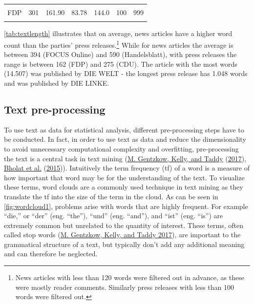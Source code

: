 \documentclass[
]{article}
\begin{document}
\begin{table}[H]
\begin{tabular}[t]{lrrrrrr}
\hspace{1em}\cellcolor{gray!6}{DIE LINKE} & \cellcolor{gray!6}{686} & \cellcolor{gray!6}{200.47} & \cellcolor{gray!6}{71.78} & \cellcolor{gray!6}{190.0} & \cellcolor{gray!6}{101} & \cellcolor{gray!6}{1048}\\
\hspace{1em}FDP & 301 & 161.90 & 83.78 & 144.0 & 100 & 999\\
\hspace{1em}\cellcolor{gray!6}{SPD} & \cellcolor{gray!6}{315} & \cellcolor{gray!6}{213.41} & \cellcolor{gray!6}{56.16} & \cellcolor{gray!6}{208.0} & \cellcolor{gray!6}{103} & \cellcolor{gray!6}{429}\\
\bottomrule
\end{tabular}
\end{table}

\autoref{tab:textlength} illustrates that on average, news articles have
a higher word count than the parties' press releases.\footnote{News
  articles with less than 120 words were filtered out in advance, as
  these were mostly reader comments. Similarly press releases with less
  than 100 words were filtered out.} While for news articles the average
is between 394 (FOCUS Online) and 590 (Handelsblatt), with press
releases the range is between 162 (FDP) and 275 (CDU). The article with
the most words (14.507) was published by DIE WELT - the longest press
release has 1.048 words and was published by DIE LINKE.

\hypertarget{text-pre-processing}{%
\subsection{Text pre-processing}\label{text-pre-processing}}

To use text as data for statistical analysis, different pre-processing
steps have to be conducted. In fact, in order to use text as data and
reduce the dimensionality to avoid unnecessary computational complexity
and overfitting, pre-processing the text is a central task in text
mining (\protect\hyperlink{ref-gentzkow_text_2017}{M. Gentzkow, Kelly,
and Taddy} (\protect\hyperlink{ref-gentzkow_text_2017}{2017}),
\protect\hyperlink{ref-bholat_text_2015}{Bholat et al.}
(\protect\hyperlink{ref-bholat_text_2015}{2015})). Intuitively the term
frequency (tf) of a word is a measure of how important that word may be
for the understanding of the text. To visualize these terms, word clouds
are a commonly used technique in text mining as they translate the tf
into the size of the term in the cloud. As can be seen in
\autoref{fig:wordcloud1}, problems arise with words that are highly
frequent. For example ``die,'' or ``der'' (eng. ``the''), ``und'' (eng.
``and''), and ``ist'' (eng. ``is'') are extremely common but unrelated
to the quantity of interest. These terms, often called stop words
(\protect\hyperlink{ref-gentzkow_text_2017}{M. Gentzkow, Kelly, and
Taddy 2017}), are important to the grammatical structure of a text, but
typically don't add any additional meaning and can therefore be
neglected.
\end{document}
